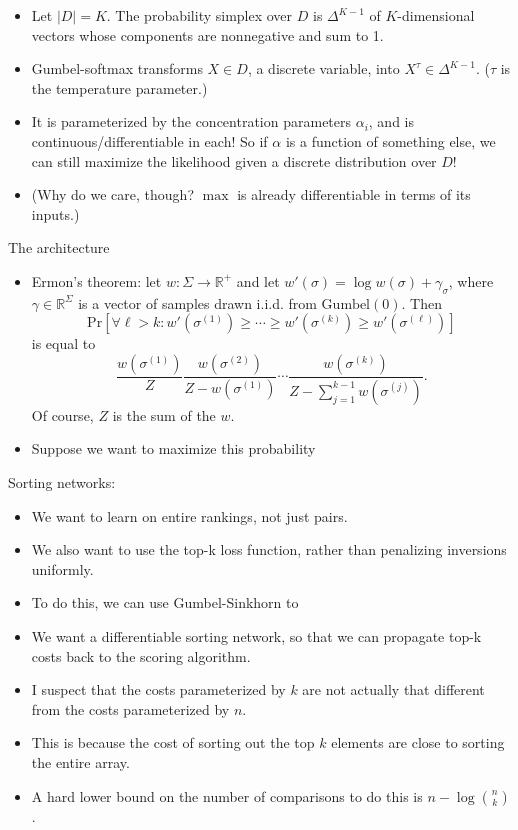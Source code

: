 \documentclass[11pt]{extarticle}
\renewcommand{\Pr}[1]{\mathrm{Pr}\left[#1\right]}
\def \R {{\mathbb R}}
\begin{document}
\begin{itemize}
    \item Let $|D| = K$. The probability simplex over $D$ is $\Delta^{K - 1}$ of $K$-dimensional vectors whose components are nonnegative and sum to 1. 

    \item Gumbel-softmax transforms $X \in D$, a discrete variable, into $X^\tau \in \Delta^{K - 1}$. ($\tau$ is the temperature parameter.)

    \item It is parameterized by the concentration parameters $\alpha_i$, and is continuous/differentiable in each! So if $\alpha$ is a function of something else, we can still maximize the likelihood given a discrete distribution over $D$!

    \item (Why do we care, though? $\max$ is already differentiable in terms of its inputs.)

  \end{itemize}

  The architecture
  \begin{itemize}
    \item Ermon's theorem: let $w : \Sigma \longrightarrow \R^+$ and let $w'(\sigma) = \log w(\sigma) + \gamma_\sigma$, where $\gamma \in \R^{\Sigma}$ is a vector of samples drawn i.i.d. from $\mathrm{Gumbel}(0)$. Then
    $$\Pr{
      \forall \ell > k:
      w'(\sigma^{(1)}) \geq \cdots \geq w'(\sigma^{(k)}) \geq w'(\sigma^{(\ell)}) 
      }$$
    is equal to 
    $$\frac{w(\sigma^{(1)})}{Z}\frac{w(\sigma^{(2)})}{Z - w(\sigma^(1))}\cdots \frac{w(\sigma^{(k)})}{Z - \sum_{j = 1}^{k - 1} w(\sigma^{(j)})}.$$
    Of course, $Z$ is the sum of the $w$.

    \item Suppose we want to maximize this probability

  \end{itemize}

  Sorting networks:
  \begin{itemize}
    \item We want to learn on entire rankings, not just pairs.
    \item We also want to use the top-k loss function, rather than penalizing inversions uniformly.
    \item To do this, we can use Gumbel-Sinkhorn to 
    \item We want a differentiable sorting network, so that we can propagate top-k costs back to the scoring algorithm.
    \item I suspect that the costs parameterized by $k$ are not actually that different from the costs parameterized by $n$.
    \item This is because the cost of sorting out the top $k$ elements are close to sorting the entire array.
    \item A hard lower bound on the number of comparisons to do this is $n - \log \binom{n}{k}$.
  \end{itemize}
\end{document}
